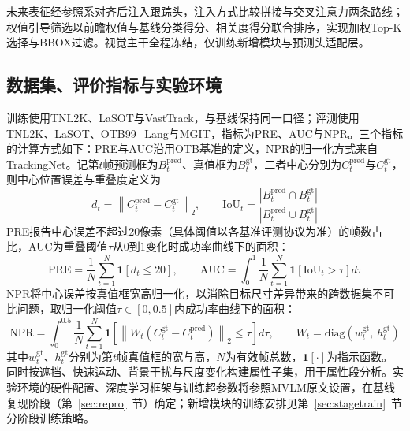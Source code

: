 未来表征经参照系对齐后注入跟踪头，注入方式比较拼接与交叉注意力两条路线；权值引导筛选以前瞻权值与基线分类得分、相关度得分联合排序，实现加权Top-K选择与BBOX过滤。视觉主干全程冻结，仅训练新增模块与预测头适配层。

\subsection{数据集、评价指标与实验环境}

训练使用TNL2K\cite{wang2021tnl2k}、LaSOT\cite{fan2021lasot}与VastTrack\cite{peng2024vasttrack}，与基线保持同一口径；评测使用TNL2K\cite{wang2021tnl2k}、LaSOT\cite{fan2021lasot}、OTB99\_Lang\cite{li2017tracking}与MGIT\cite{hu2023mgit}，指标为PRE、AUC与NPR。三个指标的计算方式如下：PRE与AUC沿用OTB基准\cite{wu2015otb}的定义，NPR的归一化方式来自TrackingNet\cite{muller2018trackingnet}。记第$t$帧预测框为$B_t^{\mathrm{pred}}$、真值框为$B_t^{\mathrm{gt}}$，二者中心分别为$C_t^{\mathrm{pred}}$与$C_t^{\mathrm{gt}}$，则中心位置误差与重叠度定义为
\begin{equation}
  d_t = \left\| C_t^{\mathrm{pred}} - C_t^{\mathrm{gt}} \right\|_2, \qquad
  \mathrm{IoU}_t = \frac{\left| B_t^{\mathrm{pred}} \cap B_t^{\mathrm{gt}} \right|}{\left| B_t^{\mathrm{pred}} \cup B_t^{\mathrm{gt}} \right|}
\end{equation}
PRE报告中心误差不超过20像素（具体阈值以各基准评测协议为准）的帧数占比，AUC为重叠阈值$\tau$从$0$到$1$变化时成功率曲线下的面积：
\begin{equation}
  \mathrm{PRE} = \frac{1}{N}\sum_{t=1}^{N} \mathbf{1}\left[ d_t \le 20 \right], \qquad
  \mathrm{AUC} = \int_0^1 \frac{1}{N}\sum_{t=1}^{N} \mathbf{1}\left[ \mathrm{IoU}_t > \tau \right] d\tau
\end{equation}
NPR将中心误差按真值框宽高归一化，以消除目标尺寸差异带来的跨数据集不可比问题，取归一化阈值$\tau\in[0,0.5]$内成功率曲线下的面积：
\begin{equation}
  \mathrm{NPR} = \int_0^{0.5} \frac{1}{N}\sum_{t=1}^{N} \mathbf{1}\left[ \left\| W_t\left( C_t^{\mathrm{gt}} - C_t^{\mathrm{pred}} \right) \right\|_2 \le \tau \right] d\tau, \qquad
  W_t = \mathrm{diag}\left( w_t^{\mathrm{gt}},\, h_t^{\mathrm{gt}} \right)
\end{equation}
其中$w_t^{\mathrm{gt}}$、$h_t^{\mathrm{gt}}$分别为第$t$帧真值框的宽与高，$N$为有效帧总数，$\mathbf{1}[\cdot]$为指示函数。同时按遮挡、快速运动、背景干扰与尺度变化构建属性子集，用于属性段分析。实验环境的硬件配置、深度学习框架与训练超参数将参照MVLM\cite{park2026mvlm}原文设置，在基线复现阶段（第~\ref{sec:repro}~节）确定；新增模块的训练安排见第~\ref{sec:stagetrain}~节分阶段训练策略。

